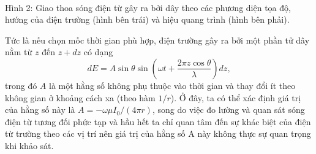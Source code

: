\begin{enumerate}
\begin{center}
\begin{minipage}{0.4\textwidth}
\centering
{}
\end{minipage} \\
\vspace{3mm}
Hình 2: Giao thoa sóng điện từ gây ra bởi dây theo các phương diện tọa độ, hướng của điện trường (hình bên trái) và hiệu quang trình (hình bên phải).
\end{center}
        Tức là nếu chọn mốc thời gian phù hợp, điện trường gây ra bởi một phần tử dây nằm từ $z$ đến $z+dz$ có dạng 
    \begin{equation} \label{eq4_far_field}
        dE = A \sin \theta \sin \left( \omega t + \dfrac{2\pi z \cos \theta}{\lambda} \right) dz,
    \end{equation}
    trong đó $A$ là một hằng số không phụ thuộc vào thời gian và thay đổi ít theo không gian ở khoảng cách xa (theo hàm $1/r$). Ở đây, ta có thể xác định giá trị của hằng số này là $A= - \omega \mu I_0/(4 \pi r)$, song do việc đo lường và quan sát sóng điện từ tương đối phức tạp và hầu hết ta chỉ quan tâm đến sự khác biệt của điện từ trường theo các vị trí nên giá trị của hằng số A này không thực sự quan trọng khi khảo sát.
    

\end{enumerate}
